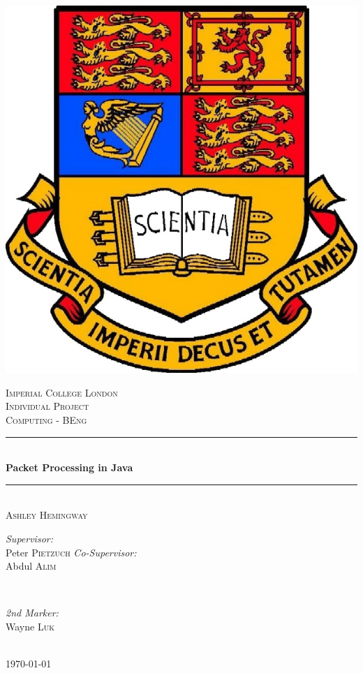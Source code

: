 \documentclass[final_report.tex]{subfiles}
\begin{document}
\begin{titlepage}

\newcommand{\HRule}{\rule{\linewidth}{0.5mm}}

\center

\includegraphics[scale=0.3]{img/icl.jpg}

\textsc{\LARGE Imperial College London}\\[1.5cm]
\textsc{\Large Individual Project}\\[0.5cm]
\textsc{\large Computing - BEng}\\[0.5cm]

\HRule \\[0.6cm]
{ \huge \bfseries Packet Processing in Java}\\[0.4cm]
\HRule \\[1.5cm]

\textsc{\LARGE Ashley Hemingway}\\[1.5cm]

\begin{minipage}{0.4\textwidth}
\begin{flushleft} \large
\emph{Supervisor:}\\
Peter \textsc{Pietzuch}
\newline
\newline
\emph{Co-Supervisor:}\\
Abdul \textsc{Alim}
\end{flushleft}
\end{minipage}
~
\begin{minipage}{0.4\textwidth}
\begin{flushright} \large
\emph{2nd Marker:} \\
Wayne \textsc{Luk}
\end{flushright}
\end{minipage}\\[2cm]

{\large \monthyeardate\today}\\[3cm]

\vfill

\end{titlepage}
\end{document}
